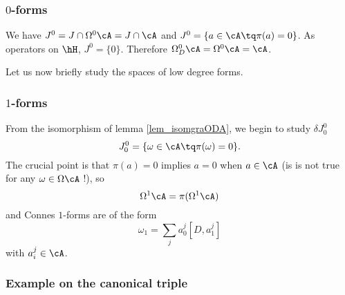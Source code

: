 \subsubsection{\texorpdfstring{$0$}{t}-forms}

We have $J^0=J\cap\Omega^0\cA=J\cap\cA$ and $J^0=\{ a\in\cA\tq \pi(a)=0 \}$. As operators on $\hH$, $J^0=\{ 0 \}$. Therefore $\Omega^0_D\cA=\Omega^0\cA=\cA$.

Let us now briefly study the spaces of low degree forms.

\subsubsection{\texorpdfstring{$1$}{1}-forms}

From the isomorphism of lemma \ref{lem_isomgraODA}, we begin to study $\delta J_0^0$
\[ 
  J_0^0=\{ \omega\in\cA\tq\pi(\omega)=0 \}.
\]
The crucial point is that $\pi(a)=0$ implies $a=0$ when $a\in\cA$ (is is not true for any $\omega\in\Omega\cA$ !), so
\begin{equation}
\Omega^1\cA=\pi(\Omega^1\cA)
\end{equation}
and Connes $1$-forms are of the form
\[ 
  \omega_1=\sum_ja_0^j[D,a_1^j]
\]
with $a_i^j\in\cA$.

\subsubsection{Example on the canonical triple}


